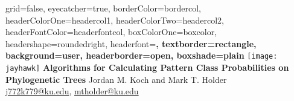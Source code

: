 \documentclass[a0paper,landscape]{baposter}
\begin{document}

\background{
}

\begin{poster}{
	grid=false,
	eyecatcher=true, 
	borderColor=bordercol,
	headerColorOne=headercol1,
	headerColorTwo=headercol2,
	headerFontColor=headerfontcol,
	boxColorOne=boxcolor,
	headershape=roundedright,
	headerfont=\Large\sf\bf,
	textborder=rectangle,
	background=user,
	headerborder=open,
  boxshade=plain
}
{
\texttt{[image: jayhawk]}
}
{\bf
	Algorithms for Calculating Pattern Class Probabilities on Phylogenetic Trees
}
{
	\vspace{1em} Jordan M. Koch and Mark T. Holder\\
	{\smaller \url{j772k779@ku.edu}, \url{mtholder@ku.edu}}
}
{

\setlength\fboxsep{0pt}
\setlength\fboxrule{0.5pt}
}


\end{poster}
\end{document}
